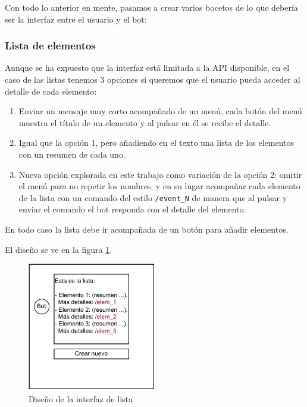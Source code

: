 Con todo lo anterior en mente, pasamos a crear varios bocetos de lo que debería ser la interfaz entre el usuario y el bot:

\subsubsection{Lista de elementos}

Aunque se ha expuesto que la interfaz está limitada a la API disponible, en el caso de las listas tenemos 3 opciones si queremos que el usuario pueda acceder al detalle de cada elemento:
\begin{enumerate}
    \item Enviar un mensaje muy corto acompañado de un menú, cada botón del menú muestra el título de un elemento y al pulsar en él se recibe el detalle.
    \item Igual que la opción 1, pero añadiendo en el texto una lista de los elementos con un resumen de cada uno.
    \item Nueva opción explorada en este trabajo como variación de la opción 2: omitir el menú para no repetir los nombres, y en su lugar acompañar cada elemento de la lista con un comando del estilo \texttt{/event\_N} de manera que al pulsar y enviar el comando el bot responda con el detalle del elemento.
\end{enumerate}

En todo caso la lista debe ir acompañada de un botón para añadir elementos.

El diseño se ve en la figura \ref{fig:disenyo_lista}.

\begin{figure}[h]
\centering
\includegraphics[width=0.5\textwidth]{imagenes/disenso_interfaz/lista.drawio.pdf}
\caption{Diseño de la interfaz de lista}
\label{fig:disenyo_lista}
\end{figure}

